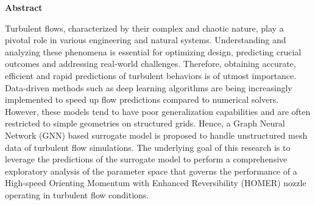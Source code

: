 \clearemptydoublepage
{}
{}

\vspace*{2cm}
\begin{center}
{\Large \textbf{Abstract}}
\end{center}
\vspace{1cm}
Turbulent flows, characterized by their complex and chaotic nature, play a pivotal role in various engineering and natural systems. Understanding and analyzing these phenomena is essential for optimizing design, predicting crucial outcomes and addressing real-world challenges. Therefore, obtaining accurate, efficient and rapid predictions of turbulent behaviors is of utmost importance. Data-driven methods such as deep learning algorithms are being increasingly implemented to speed up flow predictions compared to numerical solvers. However, these models tend to have poor generalization capabilities and are often restricted to simple geometries on structured grids. Hence, a Graph Neural Network (GNN) based surrogate model is proposed to handle unstructured mesh data of turbulent flow simulations. The underlying goal of this research is to leverage the predictions of the surrogate model to perform a comprehensive exploratory analysis of the parameter space that governs the performance of a High-speed Orienting Momentum with Enhanced Reversibility (HOMER) nozzle operating in turbulent flow conditions.
